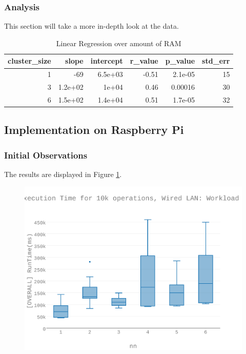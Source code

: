 \subsubsection{Analysis}
This section will take a more in-depth look at the data.


\begin{table}[H]
\centering
\begin{tabular}{rrrrrr}
\toprule
 cluster\_size &   slope &  intercept &  r\_value &  p\_value &  std\_err \\
\midrule
            1 &     -69 &    6.5e+03 &    -0.51 &  2.1e-05 &       15 \\
            3 & 1.2e+02 &      1e+04 &     0.46 &  0.00016 &       30 \\
            6 & 1.5e+02 &    1.4e+04 &     0.51 &  1.7e-05 &       32 \\
\bottomrule
\end{tabular}
\caption{Linear Regression over amount of RAM}
\label{table:ram_v_ram_a}
\end{table}



\subsection{Implementation on Raspberry Pi}
\subsubsection{Initial Observations}
The results are displayed in Figure \ref{figures-wla_fig10}.  \begin{figure}[h]
\includegraphics[width=5.5in]{Figures/figures-wla_fig10.pdf}
\caption{}
\label{figures-wla_fig10}
\end{figure}




